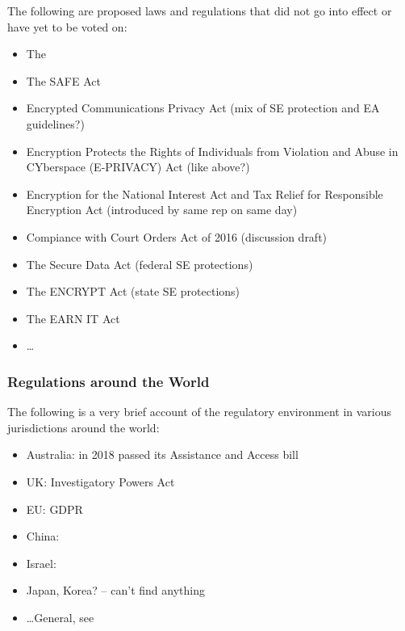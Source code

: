The following are proposed laws and regulations that did not go into effect or have yet to be voted on:

\begin{itemize}
    \item The  \cite{press_1993} \cite{thompson_2015}
    \item The SAFE Act \cite{goodlatte_hr3011_1996}
    \item Encrypted Communications Privacy Act (mix of SE protection and EA guidelines?) \cite{leahy_s376_1997}
    \item Encryption Protects the Rights of Individuals from Violation and Abuse in CYberspace (E-PRIVACY) Act
        (like above?) \cite{ashcroft_s2067_1998}
    \item Encryption for the National Interest Act and Tax Relief for Responsible Encryption Act (introduced by same rep
        on same day) \cite{goss_hr2616_1999} \cite{goss_hr2617_1999}
    \item Compiance with Court Orders Act of 2016 (discussion draft) \cite{burr_2016}
    \item The Secure Data Act (federal SE protections) \cite{lofgren_hr5823_2018}
    \item The ENCRYPT Act (state SE protections) \cite{lieu_hr4170_2019}
    \item The EARN IT Act \cite{graham_s3398_2020}
    \item \dots
\end{itemize}

\subsubsection*{Regulations around the World}

The following is a very brief account of the regulatory environment in various jurisdictions around the world:

\begin{itemize}
    \item Australia: in 2018 passed its Assistance and Access bill \cite{ag_2018} \cite{newman_2018}
    \item UK: Investigatory Powers Act \cite{legislature_2016}
    \item EU: GDPR \cite{parliament_2016}
    \item China: \cite{donahue_comparative_2018}
    \item Israel: \cite{donahue_comparative_2018}
    \item Japan, Korea? -- can't find anything
    \item \dots General, see \cite{budish_encryption_2018}
\end{itemize}

